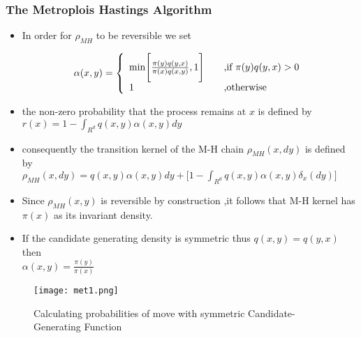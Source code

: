 \documentclass[hyperref={pdfpagelabels=false}]{beamer}
\begin{document}
\begin{frame}
\frametitle{The Metroplois Hastings Algorithm}
\begin{itemize}

\pause
\item In order for $\rho_{MH}$ to be reversible we set


\[ \alpha(x,y) = \left\{ 
 \begin{array}{l l}
 \textrm{min}\Bigg[ \frac{\pi(y)q(y,x)}{\pi(x)q(x,y)},1\Bigg] & \quad \textrm{,if $\pi(y)q(y,x)>0$}\\
   1 & \quad \textrm{,otherwise}
  \end{array} \right.\]
\pause
\item the non-zero probability that the process remains at $x$  is defined  by $ r(x)=1-\int_{R^{d}}q(x,y)\alpha(x,y)dy$


\end{itemize}

\end{frame}

\begin{frame}
\begin{itemize}
\pause
\item consequently the transition kernel of the M-H chain 
$\rho_{MH  }(x,dy)$ is defined by\\
 \vspace{3mm}
$\rho_{MH  }(x,dy)=q(x,y)\alpha(x,y)dy+\Bigg[1-\int_{R^{d}}q(x,y)\alpha(x,y)\delta_{x}(dy)\Bigg]$

\pause
\item  Since $\rho_{MH  }(x,y)$ is reversible by construction ,it follows that M-H kernel has $\pi(x)$ as its invariant density.
\pause
\item If the candidate generating density is symmetric thus $q(x,y)=q(y,x)$ then \\
$\alpha(x,y)=\frac{\pi(y)}{\pi(x)}$
\end{itemize}
\end{frame}


\begin{frame}

\begin{figure}[h!]
  
  \centering
    \texttt{[image: met1.png]}
\caption{Calculating probabilities of move with symmetric Candidate-Generating Function}
\label{fig:awesome_image}
\end{figure}
\end{frame}
\end{document}
